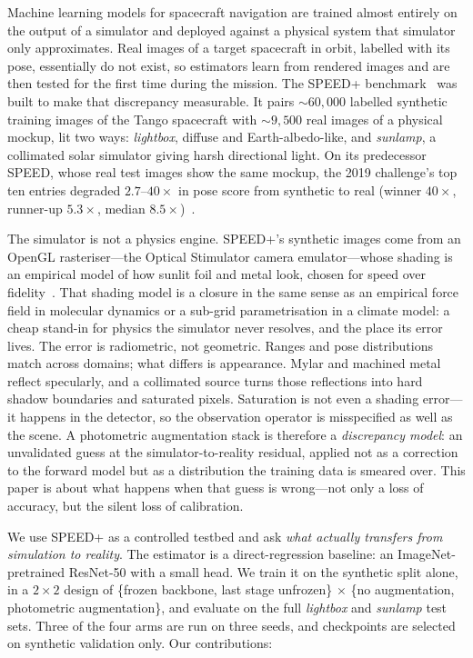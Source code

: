 \documentclass{article}
\begin{document}
Machine learning models for spacecraft navigation are trained almost entirely on the output of a
simulator and deployed against a physical system that simulator only approximates.
Real images of a target spacecraft in orbit, labelled with its pose, essentially do not
exist, so estimators learn from rendered images and are then tested
for the first time during the mission. The SPEED+ benchmark~\citep{park2022speedplus}
was built to make that discrepancy measurable. It pairs ${\sim}60{,}000$ labelled
synthetic training images of the Tango spacecraft with ${\sim}9{,}500$ real images of a
physical mockup, lit two ways: \emph{lightbox}, diffuse and Earth-albedo-like, and
\emph{sunlamp}, a collimated solar simulator giving harsh directional light. On its
predecessor SPEED, whose real test images show the same mockup, the 2019 challenge's top
ten entries degraded $2.7$--$40\times$ in pose score from synthetic to real (winner
$40\times$, runner-up $5.3\times$, median $8.5\times$)~\citep{kisantal2020speed}.

The simulator is not a physics engine. SPEED+'s synthetic images come from an OpenGL
rasteriser---the Optical Stimulator camera emulator---whose shading is an empirical
model of how sunlit foil and metal look, chosen for speed over
fidelity~\citep{park2022speedplus}. That shading model is a closure in the same sense as
an empirical force field in molecular dynamics or a sub-grid parametrisation in a
climate model: a cheap stand-in for physics the simulator never resolves, and the place
its error lives. The error is radiometric, not geometric. Ranges and pose distributions
match across domains; what differs is appearance. Mylar and machined metal reflect
specularly, and a collimated source turns those reflections into hard shadow boundaries
and saturated pixels. Saturation is not even a shading error---it happens in the
detector, so the observation operator is misspecified as well as the scene. A
photometric augmentation stack is therefore a \emph{discrepancy model}: an unvalidated
guess at the simulator-to-reality residual, applied not as a correction to the forward
model but as a distribution the training data is smeared over. This paper is about
what happens when that guess is wrong---not only a loss of accuracy, but the silent loss
of calibration.

We use SPEED+ as a controlled testbed and ask \emph{what actually transfers from
simulation to reality}. The estimator is a direct-regression baseline: an
ImageNet-pretrained ResNet-50 with a small head. We train it on the synthetic split
alone, in a $2{\times}2$ design of \{frozen backbone, last stage unfrozen\} $\times$ \{no
augmentation, photometric augmentation\}, and evaluate on the full \emph{lightbox} and
\emph{sunlamp} test sets. Three of the four arms are run on three seeds, and checkpoints are
selected on synthetic validation only. Our contributions:
\end{document}
